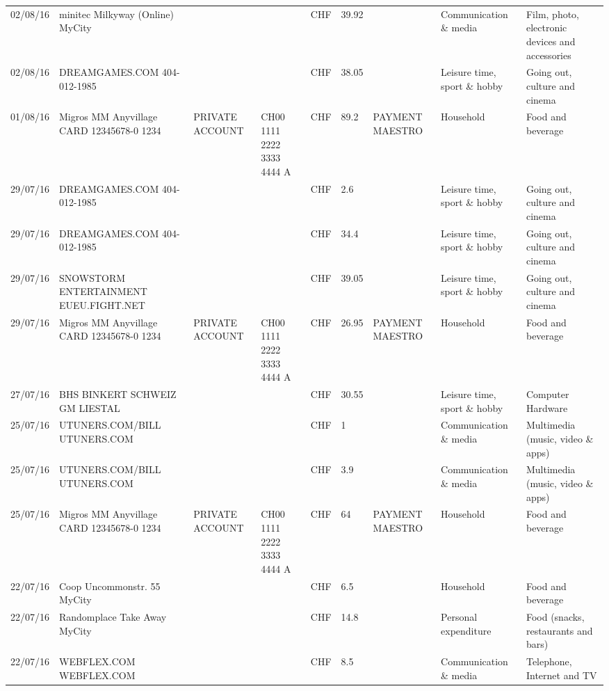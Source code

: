\begin{landscape}
\begin{center}
\begin{longtable}{lllllllll}
		02/08/16 & minitec Milkyway (Online) MyCity &       &       & CHF   & 39.92 &       & Communication \& media & Film, photo, electronic devices and accessories \\
		02/08/16 & DREAMGAMES.COM           404-012-1985 &       &       & CHF   & 38.05 &       & Leisure time, sport \& hobby & Going out, culture and cinema \\
		01/08/16 & Migros MM Anyvillage CARD 12345678-0 1234 & PRIVATE ACCOUNT & CH00 1111 2222 3333 4444 A & CHF   & 89.2  & PAYMENT MAESTRO & Household & Food and beverage \\
		29/07/16 & DREAMGAMES.COM           404-012-1985 &       &       & CHF   & 2.6   &       & Leisure time, sport \& hobby & Going out, culture and cinema \\
		29/07/16 & DREAMGAMES.COM           404-012-1985 &       &       & CHF   & 34.4  &       & Leisure time, sport \& hobby & Going out, culture and cinema \\
		29/07/16 & SNOWSTORM ENTERTAINMENT EUEU.FIGHT.NET &       &       & CHF   & 39.05 &       & Leisure time, sport \& hobby & Going out, culture and cinema \\
		29/07/16 & Migros MM Anyvillage CARD 12345678-0 1234 & PRIVATE ACCOUNT & CH00 1111 2222 3333 4444 A & CHF   & 26.95 & PAYMENT MAESTRO & Household & Food and beverage \\
		27/07/16 & BHS BINKERT SCHWEIZ GM   LIESTAL &       &       & CHF   & 30.55 &       & Leisure time, sport \& hobby & Computer Hardware \\
		25/07/16 & UTUNERS.COM/BILL          UTUNERS.COM &       &       & CHF   & 1     &       & Communication \& media & Multimedia (music, video \& apps) \\
		25/07/16 & UTUNERS.COM/BILL          UTUNERS.COM &       &       & CHF   & 3.9   &       & Communication \& media & Multimedia (music, video \& apps) \\
		25/07/16 & Migros MM Anyvillage CARD 12345678-0 1234 & PRIVATE ACCOUNT & CH00 1111 2222 3333 4444 A & CHF   & 64    & PAYMENT MAESTRO & Household & Food and beverage \\
		22/07/16 & Coop Uncommonstr. 55   MyCity &       &       & CHF   & 6.5   &       & Household & Food and beverage \\
		22/07/16 & Randomplace Take Away     MyCity &       &       & CHF   & 14.8  &       & Personal expenditure & Food (snacks, restaurants and bars) \\
		22/07/16 & WEBFLEX.COM              WEBFLEX.COM &       &       & CHF   & 8.5   &       & Communication \& media & Telephone,  Internet and TV \\

\end{longtable}
\end{center}
\end{landscape}
